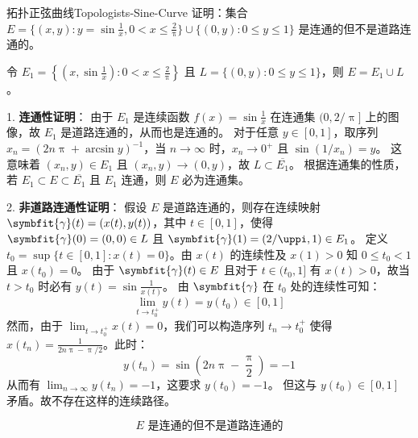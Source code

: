 \begin{problem}{拓扑正弦曲线}{Topologists-Sine-Curve}
    证明：集合 $E = \{(x,y) : y = \sin \frac{1}{x}, 0 < x \leqslant \frac{2}{\uppi}\} \cup \{(0,y) : 0 \leqslant y \leqslant 1\}$ 是连通的但不是道路连通的。

    \begin{center}
    \end{center}
\end{problem}

\begin{myproof}
    令 $E_1 = \left\{ \left(x, \sin \frac{1}{x}\right) : 0 < x \leqslant \frac{2}{\uppi} \right\}$ 且 $L = \{(0, y) : 0 \leqslant y \leqslant 1\}$，则 $E = E_1 \cup L$。

    1. \textbf{连通性证明}：
    由于 $E_1$ 是连续函数 $f(x) = \sin \frac{1}{x}$ 在连通集 $(0, 2/\uppi]$ 上的图像，故 $E_1$ 是道路连通的，从而也是连通的。
    对于任意 $y \in [0, 1]$，取序列 $x_n = \left( 2n\uppi + \arcsin y \right)^{-1}$，当 $n \to \infty$ 时，$x_n \to 0^+$ 且 $\sin(1/x_n) = y$。
    这意味着 $(x_n, y) \in E_1$ 且 $(x_n, y) \to (0, y)$，故 $L \subset \overline{E_1}$。
    根据连通集的性质，若 $E_1 \subset E \subset \overline{E_1}$ 且 $E_1$ 连通，则 $E$ 必为连通集。

    2. \textbf{非道路连通性证明}：
    假设 $E$ 是道路连通的，则存在连续映射 $\symbfit{\gamma}(t) = (x(t), y(t))$，其中 $t \in [0, 1]$，使得 $\symbfit{\gamma}(0) = (0, 0) \in L$ 且 $\symbfit{\gamma}(1) = (2/\uppi, 1) \in E_1$。
    定义 $t_0 = \sup \{ t \in [0, 1] : x(t) = 0 \}$。由 $x(t)$ 的连续性及 $x(1) > 0$ 知 $0 \leqslant t_0 < 1$ 且 $x(t_0) = 0$。
    由于 $\symbfit{\gamma}(t) \in E$ 且对于 $t \in (t_0, 1]$ 有 $x(t) > 0$，故当 $t > t_0$ 时必有 $y(t) = \sin \frac{1}{x(t)}$。
    由 $\symbfit{\gamma}$ 在 $t_0$ 处的连续性可知：
    \begin{equation}
        \lim_{t \to t_0^+} y(t) = y(t_0) \in [0, 1]
    \end{equation}
    然而，由于 $\lim_{t \to t_0^+} x(t) = 0$，我们可以构造序列 $t_n \to t_0^+$ 使得 $x(t_n) = \frac{1}{2n\uppi - \uppi/2}$。此时：
    \begin{equation}
        y(t_n) = \sin\left( 2n\uppi - \frac{\uppi}{2} \right) = -1
    \end{equation}
    从而有 $\lim_{n \to \infty} y(t_n) = -1$，这要求 $y(t_0) = -1$。
    但这与 $y(t_0) \in [0, 1]$ 矛盾。故不存在这样的连续路径。

    \begin{equation}
        \boxed{E \text{ 是连通的但不是道路连通的}}
    \end{equation}
\end{myproof}


